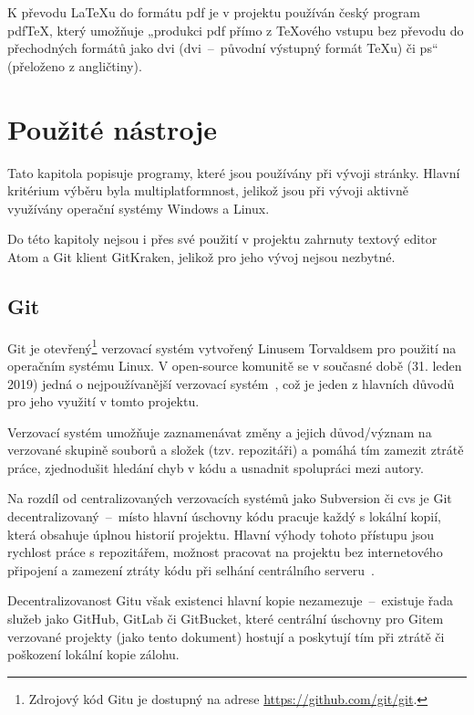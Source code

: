 \documentclass[a4paper, 12pt]{article}
\begin{document}
  K převodu \LaTeX u do formátu \gls{pdf} je v projektu používán český program pdf\TeX, který umožňuje „produkci \gls{pdf} přímo z \TeX ového vstupu bez převodu do přechodných formátů jako \acrshort{dvi} (\acrlong{dvi}~--~původní výstupný formát \TeX u) či \gls{ps}“~\cite{pdftex} (přeloženo z angličtiny).


  \section{Použité nástroje} \label{sec:Použité nástroje}
  Tato kapitola popisuje programy, které jsou používány při vývoji stránky. Hlavní kritérium výběru byla multiplatformnost, jelikož jsou při vývoji aktivně využívány operační systémy Windows a Linux.

  Do této kapitoly nejsou i přes své použití v projektu zahrnuty textový editor Atom a Git klient GitKraken, jelikož pro jeho vývoj nejsou nezbytné.


  \subsection{Git} \label{sec:Git}
  Git je otevřený\footnote{Zdrojový kód Gitu je dostupný na adrese \url{https://github.com/git/git}.} verzovací systém vytvořený Linusem Torvaldsem pro použití na operačním systému Linux. V open-source komunitě se v současné době (31. leden 2019) jedná o nejpoužívanější verzovací systém~\cite{version-control-usage-statistics}, což je jeden z hlavních důvodů pro jeho využití v tomto projektu.

  Verzovací systém umožňuje zaznamenávat změny a jejich důvod/význam na verzované skupině souborů a složek (tzv. repozitáři) a pomáhá tím zamezit ztrátě práce, zjednodušit hledání chyb v kódu a usnadnit spolupráci mezi autory.

  Na rozdíl od centralizovaných verzovacích systémů jako Subversion či \gls{cvs} je Git decentralizovaný~--~místo hlavní úschovny kódu pracuje každý s lokální kopií, která obsahuje úplnou historií projektu. Hlavní výhody tohoto přístupu jsou rychlost práce s repozitářem, možnost pracovat na projektu bez internetového připojení a zamezení ztráty kódu při selhání centrálního serveru~\cite{cvcs-vs-dvcs}.

  Decentralizovanost Gitu však existenci hlavní kopie nezamezuje~--~existuje řada služeb jako GitHub, GitLab či GitBucket, které centrální úschovny pro Gitem verzované projekty (jako tento dokument) hostují a poskytují tím při ztrátě či poškození lokální kopie zálohu.
\end{document}
